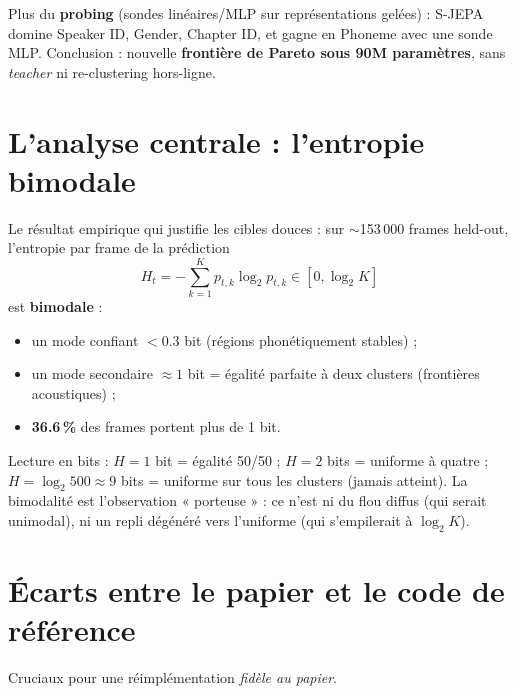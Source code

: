 \documentclass[11pt,a4paper]{article}
\begin{document}
Plus du \textbf{probing} (sondes linéaires/MLP sur représentations gelées) :
S-JEPA domine Speaker ID, Gender, Chapter ID, et gagne en Phoneme avec une
sonde MLP. Conclusion : nouvelle \textbf{frontière de Pareto sous 90M
paramètres}, sans \emph{teacher} ni re-clustering hors-ligne.

\section{L'analyse centrale : l'entropie bimodale}
\label{sec:analysis}

Le résultat empirique qui justifie les cibles douces : sur $\sim$153\,000
frames held-out, l'entropie par frame de la prédiction
\begin{equation}
H_t = -\sum_{k=1}^{K} p_{t,k}\log_2 p_{t,k} \in [0, \log_2 K]
\end{equation}
est \textbf{bimodale} :
\begin{itemize}[leftmargin=*]
  \item un mode confiant $< 0.3$ bit (régions phonétiquement stables) ;
  \item un mode secondaire $\approx 1$ bit = égalité parfaite à deux clusters
  (frontières acoustiques) ;
  \item \textbf{36.6\,\%} des frames portent plus de 1 bit.
\end{itemize}
Lecture en bits : $H=1$ bit = égalité 50/50 ; $H=2$ bits = uniforme à
quatre ; $H=\log_2 500\approx 9$ bits = uniforme sur tous les clusters
(jamais atteint). La bimodalité est l'observation « porteuse » : ce n'est
ni du flou diffus (qui serait unimodal), ni un repli dégénéré vers
l'uniforme (qui s'empilerait à $\log_2 K$).

\section{Écarts entre le papier et le code de référence}
\label{sec:gaps}

Cruciaux pour une réimplémentation \emph{fidèle au papier}.
\end{document}
